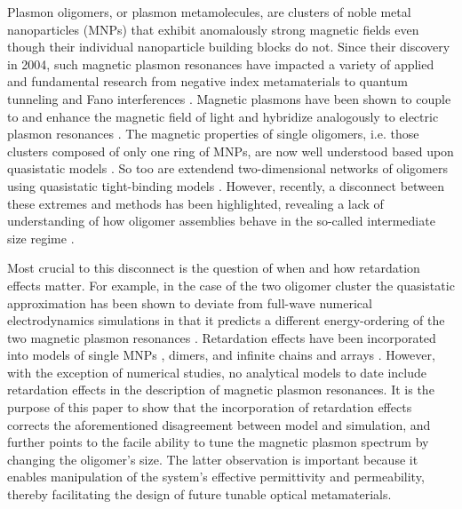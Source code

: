 \documentclass[journal=apchd5,manuscript=article]{achemso}
\begin{document}

Plasmon oligomers, or plasmon metamolecules, are clusters of noble metal nanoparticles (MNPs) that exhibit anomalously strong magnetic fields even though their individual nanoparticle building blocks do not. Since their discovery in 2004, such magnetic plasmon resonances have impacted a variety of applied and fundamental research from negative index metamaterials to quantum tunneling and Fano interferences \cite{Prodan2003,Shalaev2004,Alu2006,Alu2008,Liu2011,Dionne2011,Cherqui2014,Qian2015,Dionne2016,Cherqui2016}. Magnetic plasmons have been shown to couple to and enhance the magnetic field of light and hybridize analogously to electric plasmon resonances \cite{Zhang2006,Zhang2007,NordHal2011,NordHal2012,Cherqui2014,Cherqui2016,Engheta2017}. The magnetic properties of single oligomers, i.e. those clusters composed of only one ring of MNPs, are now well understood based upon quasistatic models \cite{Nord2006,Dionne2011,Dionne2016,Capolino2017}. So too are extendend two-dimensional networks of oligomers using quasistatic tight-binding models \cite{Schatz2003,Weick2013}. However, recently, a disconnect between these extremes and methods has been highlighted, revealing a lack of understanding of how oligomer assemblies behave in the so-called intermediate size regime \cite{NordHal2011,NordHal2012,Cherqui2014,Cherqui2016,Engheta2017,Fakhraai2018,Scherer2018}.

Most crucial to this disconnect is the question of when and how retardation effects matter. For example, in the case of the two oligomer cluster the quasistatic approximation has been shown to deviate from full-wave numerical electrodynamics simulations in that it predicts a different energy-ordering of the two magnetic plasmon resonances \cite{Cherqui2014}. Retardation effects have been incorporated into models of single MNPs \cite{Gu2010}, dimers\cite{Oubre2004,vonPlessen2007}, and infinite chains and arrays \cite{Lucas1976,ARAVIND1981,Kottman2001,NordHal2003,NordProdan2004,Rechbacher2003,Schatz2003,Royer2005,Abajo2008,Gomez2009,Chumanov2010,Pinchuk2016}. However, with the exception of numerical studies, no analytical models to date include retardation effects in the description of magnetic plasmon resonances. It is the purpose of this paper to show that the incorporation of retardation effects corrects the aforementioned disagreement between model and simulation, and further points to the facile ability to tune the magnetic plasmon spectrum by changing the oligomer's size. The latter observation is important because it enables manipulation of the system's effective permittivity and permeability, thereby facilitating the design of future tunable optical metamaterials.
\end{document}
